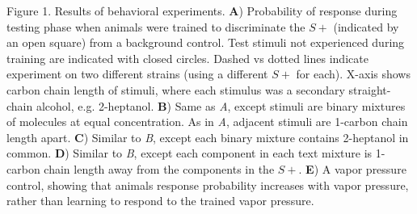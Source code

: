 \label{fig:results}
Figure 1. Results of behavioral experiments. \textbf{A}) Probability of response during testing phase when animals were trained to discriminate the $S+$ (indicated by an open square) from a background control.  Test stimuli not experienced during training are indicated with closed circles.  Dashed vs dotted lines indicate experiment on two different strains (using a different $S+$ for each).  X-axis shows carbon chain length of stimuli, where each stimulus was a secondary straight-chain alcohol, e.g. 2-heptanol.  \textbf{B}) Same as \textit{A}, except stimuli are binary mixtures of molecules at equal concentration.  As in \textit{A}, adjacent stimuli are 1-carbon chain length apart. \textbf{C}) Similar to \textit{B}, except each binary mixture contains 2-heptanol in common. \textbf{D}) Similar to \textit{B}, except each component in each text mixture is 1-carbon chain length away from the components in the $S+$. \textbf{E}) A vapor pressure control, showing that animals response probability increases with vapor pressure, rather than learning to respond to the trained vapor pressure.  